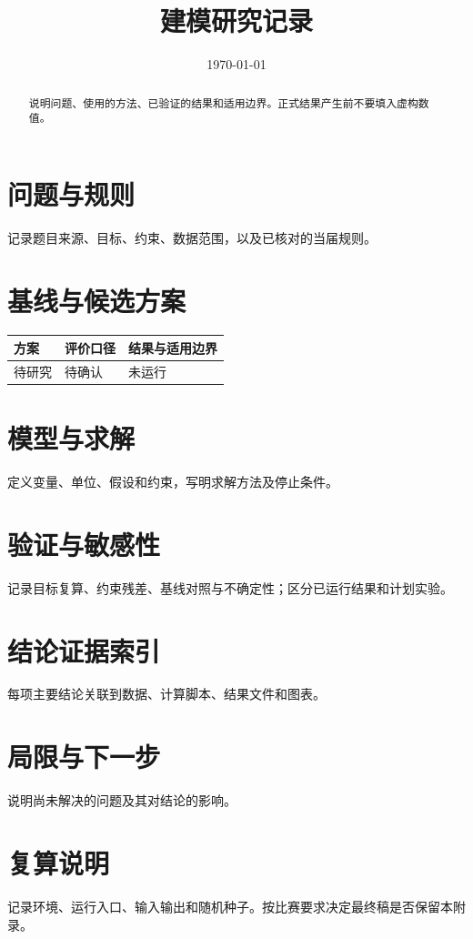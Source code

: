 \documentclass[UTF8,fontset=fandol,12pt,a4paper]{ctexart}
\title{建模研究记录}
\author{}
\date{\today}
\begin{document}
\maketitle
\begin{abstract}
说明问题、使用的方法、已验证的结果和适用边界。正式结果产生前不要填入虚构数值。
\end{abstract}
\section{问题与规则}
记录题目来源、目标、约束、数据范围，以及已核对的当届规则。
\section{基线与候选方案}
\begin{longtable}{p{}p{}p{}}
\toprule 方案 & 评价口径 & 结果与适用边界 \\ \midrule
待研究 & 待确认 & 未运行 \\ \bottomrule
\end{longtable}
\section{模型与求解}
定义变量、单位、假设和约束，写明求解方法及停止条件。
\section{验证与敏感性}
记录目标复算、约束残差、基线对照与不确定性；区分已运行结果和计划实验。
\section{结论证据索引}
每项主要结论关联到数据、计算脚本、结果文件和图表。
\section{局限与下一步}
说明尚未解决的问题及其对结论的影响。
\appendix
\section{复算说明}
记录环境、运行入口、输入输出和随机种子。按比赛要求决定最终稿是否保留本附录。
\end{document}
